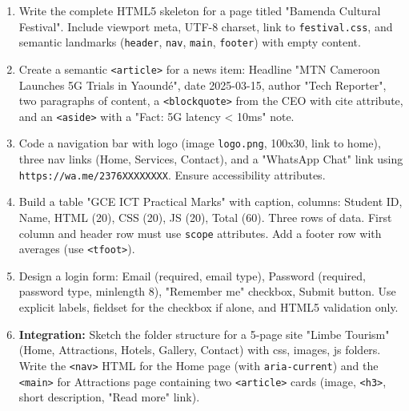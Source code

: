 \documentclass[11pt]{article}
\begin{document}
\begin{exercice}
\begin{enumerate}
    \item Write the complete HTML5 skeleton for a page titled "Bamenda Cultural Festival". Include viewport meta, UTF-8 charset, link to \texttt{festival.css}, and semantic landmarks (\texttt{header}, \texttt{nav}, \texttt{main}, \texttt{footer}) with empty content.
    \item Create a semantic \texttt{<article>} for a news item: Headline "MTN Cameroon Launches 5G Trials in Yaoundé", date 2025-03-15, author "Tech Reporter", two paragraphs of content, a \texttt{<blockquote>} from the CEO with cite attribute, and an \texttt{<aside>} with a "Fact: 5G latency < 10ms" note.
    \item Code a navigation bar with logo (image \texttt{logo.png}, 100x30, link to home), three nav links (Home, Services, Contact), and a "WhatsApp Chat" link using \texttt{https://wa.me/2376XXXXXXXX}. Ensure accessibility attributes.
    \item Build a table "GCE ICT Practical Marks" with caption, columns: Student ID, Name, HTML (20), CSS (20), JS (20), Total (60). Three rows of data. First column and header row must use \texttt{scope} attributes. Add a footer row with averages (use \texttt{<tfoot>}).
    \item Design a login form: Email (required, email type), Password (required, password type, minlength 8), "Remember me" checkbox, Submit button. Use explicit labels, fieldset for the checkbox if alone, and HTML5 validation only.
    \item \textbf{Integration:} Sketch the folder structure for a 5-page site "Limbe Tourism" (Home, Attractions, Hotels, Gallery, Contact) with css, images, js folders. Write the \texttt{<nav>} HTML for the Home page (with \texttt{aria-current}) and the \texttt{<main>} for Attractions page containing two \texttt{<article>} cards (image, \texttt{<h3>}, short description, "Read more" link).
\end{enumerate}
\end{exercice}
\end{document}
